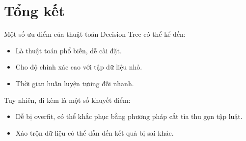 \documentclass[12pt]{article}
\begin{document}
\section{Tổng kết}
Một số ưu điểm của thuật toán Decision Tree có thể kể đến:
\begin{itemize}
\item Là thuật toán phổ biến, dễ cài đặt.
\item Cho độ chính xác cao với tập dữ liệu nhỏ.
\item Thời gian huấn luyện tương đối nhanh.
\end{itemize}
Tuy nhiên, đi kèm là một số khuyết điểm:
\begin{itemize}
\item Dễ bị overfit, có thể khắc phục bằng phương pháp cắt tỉa thu gọn tập luật.
\item Xáo trộn dữ liệu có thể dẫn đến kết quả bị sai khác.\cite{Kowsari_2019}
\end{itemize}


\cleardoublepage
{}
{}


\end{document}
